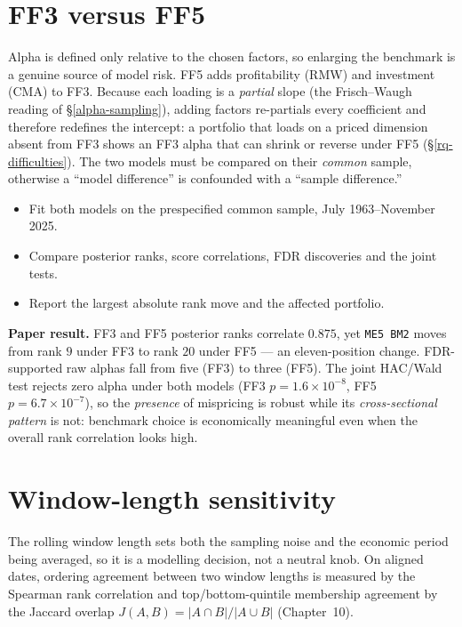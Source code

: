\hypertarget{ff3-versus-ff5}{%
\section{FF3 versus FF5}\label{ff3-versus-ff5}}

Alpha is defined only relative to the chosen factors, so enlarging the
benchmark is a genuine source of model risk. FF5 adds profitability (RMW)
and investment (CMA) to FF3. Because each loading is a \emph{partial} slope
(the Frisch--Waugh reading of \S\ref{alpha-sampling}), adding factors
re-partials every coefficient and therefore redefines the intercept: a
portfolio that loads on a priced dimension absent from FF3 shows an FF3
alpha that can shrink or reverse under FF5 (\S\ref{rq-difficulties}). The
two models must be compared on their \emph{common} sample, otherwise a
``model difference'' is confounded with a ``sample difference.''
\begin{itemize}
\tightlist
\item
  Fit both models on the prespecified common sample, July 1963--November
  2025.
\item
  Compare posterior ranks, score correlations, FDR discoveries and the
  joint tests.
\item
  Report the largest absolute rank move and the affected portfolio.
\end{itemize}

\textbf{Paper result.} FF3 and FF5 posterior ranks correlate $0.875$, yet
\texttt{ME5\ BM2} moves from rank $9$ under FF3 to rank $20$ under FF5 --- an
eleven-position change. FDR-supported raw alphas fall from five (FF3) to
three (FF5). The joint HAC/Wald test rejects zero alpha under both models
(FF3 $p=1.6\times10^{-8}$, FF5 $p=6.7\times10^{-7}$), so the \emph{presence}
of mispricing is robust while its \emph{cross-sectional pattern} is not:
benchmark choice is economically meaningful even when the overall rank
correlation looks high.

\hypertarget{window-length-sensitivity}{%
\section{Window-length sensitivity}\label{window-length-sensitivity}}

The rolling window length sets both the sampling noise and the economic
period being averaged, so it is a modelling decision, not a neutral knob.
On aligned dates, ordering agreement between two window lengths is measured
by the Spearman rank correlation and top/bottom-quintile membership
agreement by the Jaccard overlap $J(A,B)=\lvert A\cap B\rvert/\lvert A\cup B\rvert$
(Chapter~10).

